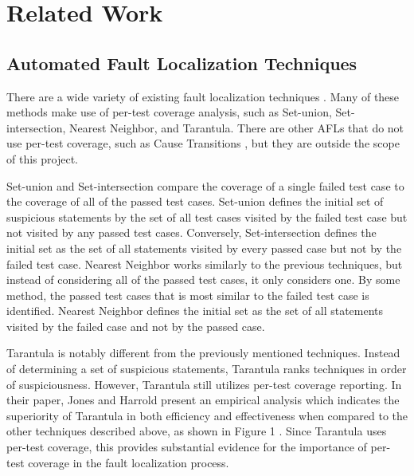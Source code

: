 %
%
\chapter{Related Work}\label{ch:relatedwork}

\section{Automated Fault Localization Techniques}\label{sec:afl}

There are a wide variety of existing fault localization techniques
\cite{harrold}. Many of these methods make use of per-test coverage
analysis, such as Set-union, Set-intersection, Nearest Neighbor, and
Tarantula.  There are other AFLs that do not use per-test coverage, such
as Cause Transitions \cite{cause}, but they are outside the scope of this project.  

Set-union and Set-intersection compare the coverage of a single failed
test case to the coverage of all of the passed test cases.  Set-union
defines the initial set of suspicious statements by the set of all test
cases visited by the failed test case but not visited by any passed test
cases.  Conversely, Set-intersection defines the initial set as the set
of all statements visited by every passed case but not by the failed
test case.  Nearest Neighbor works similarly to the previous techniques,
but instead of considering all of the passed test cases, it only
considers one.  By some method, the passed test cases that is most
similar to the failed test case is identified.  Nearest Neighbor defines
the initial set as the set of all statements visited by the failed case
and not by the passed case.

Tarantula is notably different from the previously mentioned techniques.
Instead of determining a set of suspicious statements, Tarantula ranks
techniques in order of suspiciousness.  However, Tarantula still
utilizes per-test coverage reporting.  In their paper, Jones and Harrold
present an empirical analysis which indicates the superiority of
Tarantula in both efficiency and effectiveness when compared to the
other techniques described above, as shown in Figure 1 \cite{harrold}.  Since Tarantula
uses per-test coverage, this provides substantial evidence for the
importance of per-test coverage in the fault localization process.

